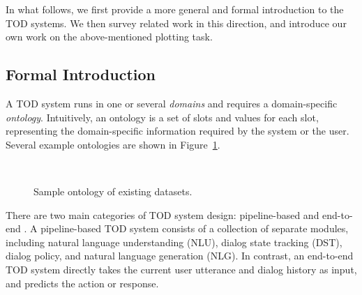 \documentclass[11pt,dvipdfm]{article}
\begin{document}
In what follows, we first provide a more general and formal introduction to the TOD systems. We then survey related work in this direction, and introduce our own work on the above-mentioned plotting task.

\subsection{Formal Introduction}
A TOD system runs in one or several \textit{domains} and requires a domain-specific \textit{ontology}. Intuitively, an ontology is a set of slots and values for each slot, representing the domain-specific information required by the system or the user.
Several example ontologies are shown in Figure~\ref{fig:sample-onto}.


\begin{figure}[h]
\centering
    ~\hspace{0.4cm}
\caption{Sample ontology of existing datasets.}
\label{fig:sample-onto}
\end{figure}


There are two main categories of TOD system design: pipeline-based and end-to-end \cite{Zhang2020RecentAA}. A pipeline-based TOD system consists of a collection of separate modules, including natural language understanding (NLU), dialog state tracking (DST), dialog policy, and natural language generation (NLG).
In contrast, an end-to-end TOD system directly takes the current user utterance and dialog history as input, and predicts the action or response.
\end{document}
